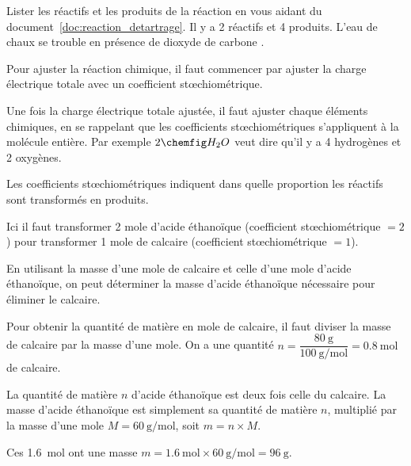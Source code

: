 \pasCorrection{\newpage\pasDePagination\vspace*{-52pt}}
\setcounter{coupDePouceNum}{0}

%
\begin{coupDePouce}
  Lister les réactifs et les produits de la réaction en vous aidant du document~\ref{doc:reaction_detartrage}.
  Il y a 2 réactifs et 4 produits.
  L'eau de chaux se trouble en présence de dioxyde de carbone \dioxydeDeCarbone.
\end{coupDePouce}

%
\begin{coupDePouce}
  Pour ajuster la réaction chimique, il faut commencer par ajuster la charge électrique totale avec un coefficient stœchiométrique.
  
  Une fois la charge électrique totale ajustée, il faut ajuster chaque éléments chimiques, en se rappelant que les coefficients stœchiométriques s'appliquent à la molécule entière. 
  Par exemple $2\eau$ veut dire qu'il y a 4 hydrogènes et 2 oxygènes.
\end{coupDePouce}

%
\begin{coupDePouce}
  Les coefficients stœchiométriques indiquent dans quelle proportion les réactifs sont transformés en produits.
  
  Ici il faut transformer 2 mole d'acide éthanoïque (coefficient stœchiométrique $ = 2$) pour transformer 1 mole de calcaire (coefficient stœchiométrique $ = 1$).
  
  En utilisant la masse d'une mole de calcaire et celle d'une mole d'acide éthanoïque, on peut déterminer la masse d'acide éthanoïque nécessaire pour éliminer le calcaire.
\end{coupDePouce}

%
\begin{coupDePouce}
  Pour obtenir la quantité de matière en mole de calcaire, il faut diviser la masse de calcaire par la masse d'une mole.
  On a une quantité $n = \dfrac{\qty{80}{\g}}{\qty{100}{\g / \mole}} = \qty{0,8}{\mole}$ de calcaire.
  
  La quantité de matière $n$ d'acide éthanoïque est deux fois celle du calcaire.
  La masse d'acide éthanoïque est simplement sa quantité de matière $n$, multiplié par la masse d'une mole $M = \qty{60}{\g / \mole}$, soit $m = n \times M$.
  
  Ces \qty{1,6}{\mole} ont une masse $m = \qty{1,6}{\mole} \times \qty{60}{\g / \mole} = \qty{96}{\g}$.
\end{coupDePouce}

